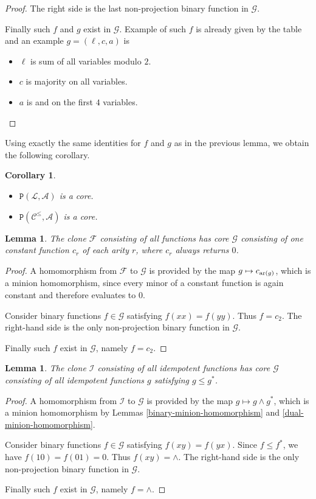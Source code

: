\documentclass{amsart}
\numberwithin{equation}{section}
\theoremstyle{plain}
\newtheorem{lemma}[theorem]{Lemma}
\newtheorem{corollary}[theorem]{Corollary}
\theoremstyle{definition}
\def\clone#1{\mathcal{#1}}
\def\minion#1{\mathcal{#1}}
\def\Ac{\clone{A}}
\def\Lc{\clone{L}}
\def\Cc{\clone{C}}
\def\C#1{{\mathtt{P}}(#1)}
\begin{document}
\begin{proof}
The right side is the last non-projection binary function in $\minion{G}$.

Finally such $f$ and $g$ exist in $\minion{G}$. Example of such $f$ is already given by the table and an example $g = (\ell,c,a)$ is 
\begin{itemize}
\item $\ell$ is sum of all variables modulo $2$.
\item $c$ is majority on all variables.
\item $a$ is and on the first $4$ variables.
\end{itemize}
\end{proof}

Using exactly the same identities for $f$ and $g$ as in the previous lemma, we obtain
the following corollary.

\begin{corollary}\label{lcleqacor}
  \hfill
  \begin{itemize}
        \item $\C{\Lc, \Ac}$ is a core.
        \item $\C{\Cc^\leq, \Ac}$ is a core.
    \end{itemize}
\end{corollary}

\begin{lemma}\label{full} The clone $\clone{F}$ consisting of all functions has core $\minion{G}$ consisting of one constant function $c_r$ of each arity $r$, where $c_r$ always returns $0$.
\end{lemma}
\begin{proof}
A homomorphism from $\clone{F}$ to $\minion{G}$ is provided by the map $g\mapsto c_{{\rm ar}(g)}$, which is a minion homomorphism, since every minor of a constant function is again constant and therefore evaluates to $0$.

Consider binary functions $f\in\minion{G}$ satisfying $f(xx) = f(yy)$. Thus $f = c_2$.
The right-hand side is the only non-projection binary function in $\minion{G}$.

Finally such $f$ exist in $\minion{G}$, namely $f = c_2$.
\end{proof}

\begin{lemma}\label{idem} The clone $\clone{I}$ consisting of all idempotent functions has core $\minion{G}$ consisting of all idempotent functions $g$ satisfying $g\leq g^*$.
\end{lemma}
\begin{proof}
A homomorphism from $\clone{I}$ to $\minion{G}$ is provided by the map $g\mapsto g\wedge g^*$, which is a minion homomorphism by Lemmas \ref{binary-minion-homomorphism} and \ref{dual-minion-homomorphism}.

Consider binary functions $f\in\minion{G}$ satisfying $f(xy) = f(yx)$.
Since $f\leq f^*$, we have $f(10)=f(01)=0$. Thus $f(xy) = \wedge$.
The right-hand side is the only non-projection binary function in $\minion{G}$.

Finally such $f$ exist in $\minion{G}$, namely $f=\wedge$.
\end{proof}
\end{document}
